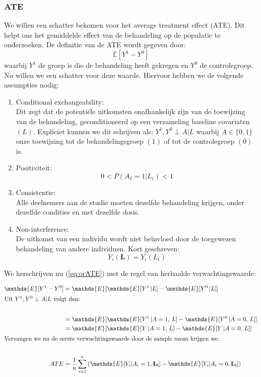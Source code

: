 \documentclass[12pt, a4paper, faculty=we]{ugent-doc}
\newcommand{\E}[1]{\mathds{E}[#1]}
\begin{document}
\subsubsection{ATE}
\begin{flushleft}
    We willen een schatter bekomen voor het average treatment effect (ATE). Dit helpt ons het gemiddelde effect van de behandeling
    op de populatie te onderzoeken. De definitie van de ATE wordt gegeven door:
    \begin{equation}
        \label{eq:orATE}
        \E{Y^1 - Y^0}
    \end{equation}
    waarbij $Y^1$ de groep is die de behandeling heeft gekregen en $Y^0$ de controlegroep.
    \newline
    Nu willen we een schatter voor deze waarde. Hiervoor hebben we de volgende assumpties nodig:
    \begin{enumerate}
        \item Conditional exchangeability:\\
        Dit zegt dat de potentiële uitkomsten onafhankelijk zijn van de toewijzing van de behandeling, geconditioneerd op een
        verzameling baseline covariaten $(L)$. Expliciet kunnen we dit schrijven als: $Y^1, Y^0 \perp A | L$ waarbij $A 
        \in \{0,1\}$ onze toewijzing tot de behandelingsgroep $(1)$ of tot de controlegroep $(0)$ is.

        \item Positiviteit: \\
        $$0 < P(A_I = 1 | L_i) < 1$$
        
        \item Consistentie: \\
        Alle deelnemers aan de studie moeten dezelfde behandeling krijgen, onder dezelfde condities en met dezelfde dosis.

        \item Non-interference: \\
        De uitkomst van een individu wordt niet beïnvloed door de toegewezen behandeling van andere individuen. Kort geschreven:
        $$Y_i(\mathbf{L}) = Y_i(L_i)  $$
    \end{enumerate}
\end{flushleft}

We herschrijven nu (\ref{eq:orATE}) met de regel van herhaalde verwachtingswaarde:

    \begin{align*}
        \E{Y^1 - Y^0} &= \E{\E{Y^1 \, | L} - \E{Y^0 \, | L} }\\
        \intertext{Uit $Y^1, Y^0 \perp A | L$ volgt dan:}\\
                          &= \E{\E{Y^1 \, | A=1, \, L} - \E{Y^0 \, | A=0, \, L} }\\
                          &= \E{\E{Y \, | A=1, \, L} - \E{Y \, | A=0, \, L} }\\
        \intertext{Vervangen we nu de eerste verwachtingswaarde door de sample mean krijgen we:}\\
        ATE        &= \frac{1}{n} \sum_{i=1}^{n} \left( \E{Y_i | A_i = 1, \mathbf{L_i}} - \E{Y_i | A_i = 0, \mathbf{L_i}} \right)\\
    \end{align*}
\end{document}

